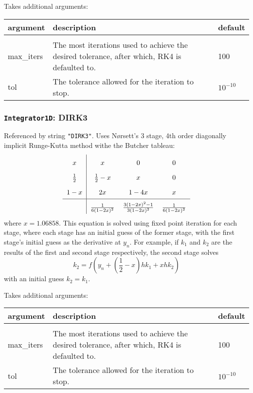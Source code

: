 \documentclass[10pt,a4paper]{article}
\newenvironment{optarglist}
    {\begin{center}
    \begin{tabular}{l|p{10cm}|l}
    argument & description & default\\
    \hline\\
    }
    { 
    \end{tabular} 
    \end{center}
    }
\begin{document}
Takes additional arguments:

\begin{optarglist}
max\_iters & The most iterations used to achieve the desired tolerance, after which, RK4 is defaulted to. & 100\\\hline
tol & The tolerance allowed for the iteration to stop. & $10^{-10}$
\end{optarglist}




\subsubsection{\texttt{Integrator1D}: DIRK3}
Referenced by string \texttt{"DIRK3"}. Uses Nørsett's 3 stage, 4th order diagonally implicit Runge-Kutta method withe the Butcher tableau:
\[\arraycolsep=6pt\def\arraystretch{1.8}\begin{array}{c|ccc}
x & x & 0 & 0\\
\frac12 & \frac12-x & x & 0\\
1-x & 2x & 1 - 4x & x\\
\hline
&\frac{1}{6(1-2x)^2} & \frac{3(1-2x)^2-1}{3(1-2x)^2} & \frac1{6(1-2x)^2}
\end{array}
\]
where $x = 1.06858$.
This equation is solved using fixed point iteration for each stage, where each stage has an initial guess of the former stage, with the first stage's initial guess as the derivative at $y_n$. For example, if $k_1$ and $k_2$ are the results of the first and second stage respectively, the second stage solves
$$k_2 = f\left(y_{n} + \left(\frac{1}{2}-x\right)hk_1 + xhk_2\right)$$
with an initial guess $k_2 = k_1$.

Takes additional arguments:

\begin{optarglist}
max\_iters & The most iterations used to achieve the desired tolerance, after which, RK4 is defaulted to. & 100\\\hline
tol & The tolerance allowed for the iteration to stop. & $10^{-10}$
\end{optarglist}
\end{document}
